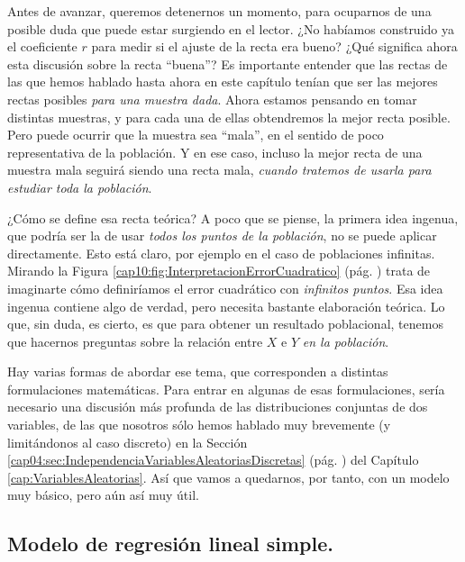 Antes de avanzar, queremos detenernos un momento, para ocuparnos de una posible duda que puede
estar surgiendo en el lector. ¿No habíamos construido ya el coeficiente $r$ para medir si el ajuste
de la recta era bueno? ¿Qué significa ahora esta discusión sobre la recta ``buena''? Es importante
entender que las rectas de las que hemos hablado hasta ahora en este capítulo tenían que ser las
mejores rectas posibles {\em para una muestra dada}. Ahora  estamos pensando en tomar distintas
muestras, y para cada una de ellas obtendremos la mejor recta posible. Pero puede ocurrir que la muestra sea ``mala'', en el sentido de poco representativa de la población. Y en ese caso, incluso la mejor
recta de una muestra mala seguirá siendo una recta mala, {\em cuando tratemos de usarla para
estudiar toda la población}.

¿Cómo se define esa recta teórica? A poco que se piense, la primera idea ingenua, que podría ser la
de usar {\em todos los puntos de la población}, no se puede aplicar directamente. Esto está claro, por ejemplo en el caso de poblaciones infinitas. Mirando la  Figura \ref{cap10:fig:InterpretacionErrorCuadratico}
(pág. \pageref{cap10:fig:InterpretacionErrorCuadratico}) trata de imaginarte cómo definiríamos el
error cuadrático con {\em infinitos puntos}. Esa idea ingenua contiene algo de verdad, pero
necesita bastante elaboración teórica. Lo que, sin duda, es cierto, es que para obtener un
resultado poblacional, tenemos que hacernos preguntas sobre la relación entre $X$ e $Y$ {\em en la
población}.

Hay varias formas de abordar ese tema, que corresponden a distintas formulaciones matemáticas. Para
entrar en algunas de esas formulaciones,
sería necesario una discusión más profunda de las distribuciones conjuntas de dos variables, de las que nosotros sólo hemos hablado muy brevemente (y limitándonos al caso discreto) en la Sección \ref{cap04:sec:IndependenciaVariablesAleatoriasDiscretas} (pág. \pageref{cap04:sec:IndependenciaVariablesAleatoriasDiscretas}) del Capítulo \ref{cap:VariablesAleatorias}. Así que vamos a quedarnos, por tanto, con un modelo muy básico, pero aún así muy útil.

\subsection{Modelo de regresión lineal simple.}
\label{cap10:subsec:modeloRegresionLinealSimple}

